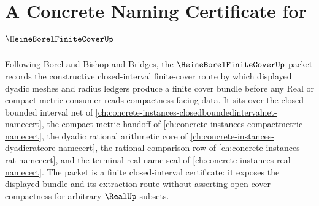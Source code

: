 \chapter{A Concrete Naming Certificate for $\HeineBorelFiniteCoverUp$}
\label{ch:concrete-instances-heine-borel-finite-cover-namecert}

Following Borel and Bishop and Bridges, the $\HeineBorelFiniteCoverUp$ packet records the constructive closed-interval finite-cover route by which displayed dyadic meshes and radius ledgers produce a finite cover bundle before any Real or compact-metric consumer reads compactness-facing data. It sits over the closed-bounded interval net of \autoref{ch:concrete-instances-closedboundedintervalnet-namecert}, the compact metric handoff of \autoref{ch:concrete-instances-compactmetric-namecert}, the dyadic rational arithmetic core of \autoref{ch:concrete-instances-dyadicratcore-namecert}, the rational comparison row of \autoref{ch:concrete-instances-rat-namecert}, and the terminal real-name seal of \autoref{ch:concrete-instances-real-namecert}. The packet is a finite closed-interval certificate: it exposes the displayed bundle and its extraction route without asserting open-cover compactness for arbitrary $\RealUp$ subsets.

